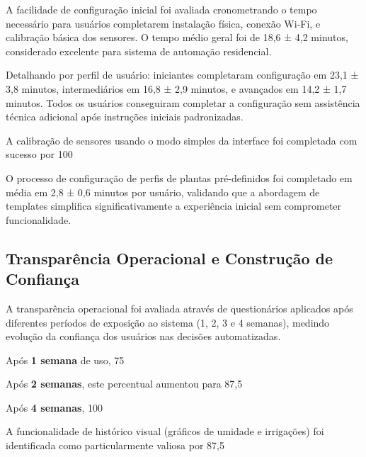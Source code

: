 A facilidade de configuração inicial foi avaliada cronometrando o tempo necessário para usuários completarem instalação física, conexão Wi-Fi, e calibração básica dos sensores. O tempo médio geral foi de 18,6 ± 4,2 minutos, considerado excelente para sistema de automação residencial.

Detalhando por perfil de usuário: iniciantes completaram configuração em 23,1 ± 3,8 minutos, intermediários em 16,8 ± 2,9 minutos, e avançados em 14,2 ± 1,7 minutos. Todos os usuários conseguiram completar a configuração sem assistência técnica adicional após instruções iniciais padronizadas.

A calibração de sensores usando o modo simples da interface foi completada com sucesso por 100%

O processo de configuração de perfis de plantas pré-definidos foi completado em média em 2,8 ± 0,6 minutos por usuário, validando que a abordagem de templates simplifica significativamente a experiência inicial sem comprometer funcionalidade.

\subsection{Transparência Operacional e Construção de Confiança}

A transparência operacional foi avaliada através de questionários aplicados após diferentes períodos de exposição ao sistema (1, 2, 3 e 4 semanas), medindo evolução da confiança dos usuários nas decisões automatizadas.

Após \textbf{1 semana} de uso, 75%

Após \textbf{2 semanas}, este percentual aumentou para 87,5%

Após \textbf{4 semanas}, 100%

A funcionalidade de histórico visual (gráficos de umidade e irrigações) foi identificada como particularmente valiosa por 87,5%

